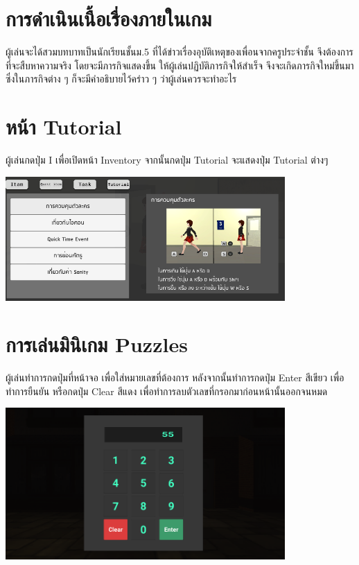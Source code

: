 \section*{การดำเนินเนื้อเรื่องภายในเกม}
ผู้เล่นจะได้สวมบทบาทเป็นนักเรียนชั้นม.5 ที่ได้ข่าวเรื่องอุบัติเหตุของเพื่อนจากครูประจำชั้น จึงต้องการที่จะสืบหาความจริง โดยจะมีภารกิจแสดงขึ้น ให้ผู้เล่นปฏิบัติภารกิจให้สำเร็จ จึงจะเกิดภารกิจใหม่ขึ้นมา ซึ่งในภารกิจต่าง ๆ ก็จะมีคำอธิบายไว้คร่าว ๆ ว่าผู้เล่นควรจะทำอะไร

\section*{หน้า Tutorial}
ผู้เล่นกดปุ่ม I เพื่อเปิดหน้า Inventory จากนั้นกดปุ่ม Tutorial จะแสดงปุ่ม Tutorial ต่างๆ
\begin{center}
    \includegraphics[width=0.8\textwidth, height=0.25\textheight]{Images/Tutorial Image.png}
\end{center}

\section*{การเล่นมินิเกม Puzzles}
ผู้เล่นทำการกดปุ่มที่หน้าจอ เพื่อใส่หมายเลขที่ต้องการ หลังจากนั้นทำการกดปุ่ม Enter สีเขียว เพื่อทำการยืนยัน หรือกดปุ่ม Clear สีแดง เพื่อทำการลบตัวเลขที่กรอกมาก่อนหน้านั้นออกจนหมด
\begin{center}
    \includegraphics[width=0.8\textwidth, height=0.25\textheight]{Images/Insert Puzzles.png}
\end{center}

